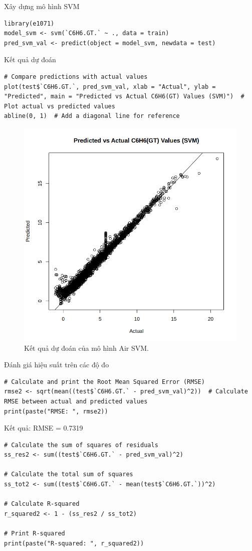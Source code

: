 Xây dựng mô hình SVM
\begin{lstlisting}
library(e1071)
model_svm <- svm(`C6H6.GT.` ~ ., data = train)
pred_svm_val <- predict(object = model_svm, newdata = test)
\end{lstlisting}

Kết quả dự đoán
\begin{lstlisting}
# Compare predictions with actual values
plot(test$`C6H6.GT.`, pred_svm_val, xlab = "Actual", ylab = "Predicted", main = "Predicted vs Actual C6H6(GT) Values (SVM)")  # Plot actual vs predicted values
abline(0, 1)  # Add a diagonal line for reference
\end{lstlisting}
\begin{figure}[H]
    \centering
    \includegraphics[width=0.75\columnwidth]{air_figures/air_svm.png}
    \caption{Kết quả dự đoán của mô hình Air SVM.}
    \label{fig:air_svm_prediction}
\end{figure}

Đánh giá hiệu suất trên các độ đo
\begin{lstlisting}
# Calculate and print the Root Mean Squared Error (RMSE)
rmse2 <- sqrt(mean((test$`C6H6.GT.` - pred_svm_val)^2))  # Calculate RMSE between actual and predicted values
print(paste("RMSE: ", rmse2)) 
\end{lstlisting}

Kết quả: RMSE = 0.7319

\begin{lstlisting}
# Calculate the sum of squares of residuals
ss_res2 <- sum((test$`C6H6.GT.` - pred_svm_val)^2)

# Calculate the total sum of squares
ss_tot2 <- sum((test$`C6H6.GT.` - mean(test$`C6H6.GT.`))^2)

# Calculate R-squared
r_squared2 <- 1 - (ss_res2 / ss_tot2)

# Print R-squared
print(paste("R-squared: ", r_squared2))
\end{lstlisting}

